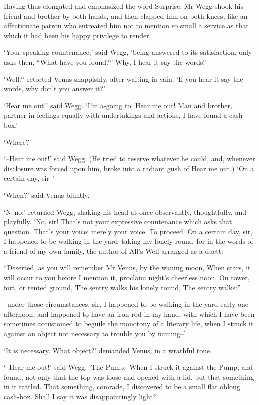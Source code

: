 Having thus elongated and emphasized the word Surprise, Mr Wegg shook
his friend and brother by both hands, and then clapped him on both
knees, like an affectionate patron who entreated him not to mention so
small a service as that which it had been his happy privilege to render.

‘Your speaking countenance,’ said Wegg, ‘being answered to its
satisfaction, only asks then, “What have you found?” Why, I hear it say
the words!’

‘Well?’ retorted Venus snappishly, after waiting in vain. ‘If you hear
it say the words, why don’t you answer it?’

‘Hear me out!’ said Wegg. ‘I’m a-going to. Hear me out! Man and brother,
partner in feelings equally with undertakings and actions, I have found
a cash-box.’

‘Where?’

‘--Hear me out!’ said Wegg. (He tried to reserve whatever he could, and,
whenever disclosure was forced upon him, broke into a radiant gush of
Hear me out.) ‘On a certain day, sir--’

‘When?’ said Venus bluntly.

‘N--no,’ returned Wegg, shaking his head at once observantly,
thoughtfully, and playfully. ‘No, sir! That’s not your expressive
countenance which asks that question. That’s your voice; merely your
voice. To proceed. On a certain day, sir, I happened to be walking in
the yard--taking my lonely round--for in the words of a friend of my own
family, the author of All’s Well arranged as a duett:

     “Deserted, as you will remember Mr Venus, by the waning
     moon,
     When stars, it will occur to you before I mention it, proclaim
     night’s cheerless noon,
     On tower, fort, or tented ground,
     The sentry walks his lonely round,
     The sentry walks:”

--under those circumstances, sir, I happened to be walking in the yard
early one afternoon, and happened to have an iron rod in my hand, with
which I have been sometimes accustomed to beguile the monotony of a
literary life, when I struck it against an object not necessary to
trouble you by naming--’

‘It is necessary. What object?’ demanded Venus, in a wrathful tone.

‘--Hear me out!’ said Wegg. ‘The Pump.--When I struck it against the
Pump, and found, not only that the top was loose and opened with a lid,
but that something in it rattled. That something, comrade, I discovered
to be a small flat oblong cash-box. Shall I say it was disappointingly
light?’

